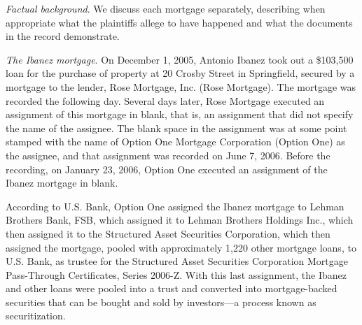 \textit{Factual background}. We discuss each mortgage separately, describing
when appropriate what the plaintiffs allege to have happened and what the
documents in the record demonstrate. 

\textit{The Ibanez mortgage}. On December 1, 2005, Antonio Ibanez took out a
\$103,500 loan for the purchase of property at 20 Crosby Street in Springfield,
secured by a mortgage to the lender, Rose Mortgage, Inc. (Rose Mortgage). The
mortgage was recorded the following day. Several days later, Rose Mortgage
executed an assignment of this mortgage in blank, that is, an assignment that
did not specify the name of the assignee. The blank space in the assignment was at some
point stamped with the name of Option One Mortgage Corporation (Option One) as
the assignee, and that assignment was recorded on June 7, 2006. Before the
recording, on January 23, 2006, Option One executed an assignment of the Ibanez
mortgage in blank.

According to U.S. Bank, Option One assigned the Ibanez mortgage to Lehman
Brothers Bank, FSB, which assigned it to Lehman Brothers Holdings Inc., which
then assigned it to the Structured Asset Securities
Corporation, which then assigned the mortgage, pooled with
approximately 1,220 other mortgage loans, to U.S. Bank, as trustee for the
Structured Asset Securities Corporation Mortgage Pass-Through Certificates,
Series 2006-Z. With this last assignment, the Ibanez and other loans were
pooled into a trust and converted into mortgage-backed securities that can be
bought and sold by investors---a process known as securitization.

